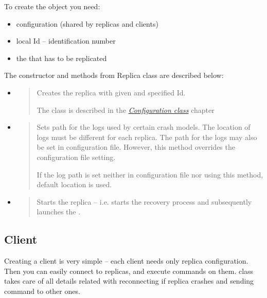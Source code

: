 To create the  object you need:
\begin{itemize}
\item {} 
configuration (shared by replicas and clients)

\item {} 
local Id -- identification number

\item {} 
the  that has to be replicated

\end{itemize}

The constructor and methods from Replica class are described below:
\begin{itemize}
\item {} 
\begin{quote}

Creates the replica with given  and specified Id.

The  class is described in the {\hyperref[config:jpaxos-configclass]{\emph{Configuration class}}} chapter
\end{quote}

\item {} 
\begin{quote}

Sets path for the logs used by certain crash models. The location of logs must be different for each replica. The path for the logs may also be set in configuration file. However, this method overrides the configuration file setting.

If the log path is set neither in configuration file nor using this method, default  location is used.
\end{quote}

\item {} 
\begin{quote}

Starts the replica -- i.e. starts the recovery process and subsequently launches the .
\end{quote}

\end{itemize}


\subsection{Client}
\label{api:jpaxos-client}\label{api:client}
Creating a client is very simple -- each client needs only replica configuration. Then you can easily connect to replicas, and execute commands on them.  class takes care of all details related with reconnecting if replica crashes and sending command to other ones.

